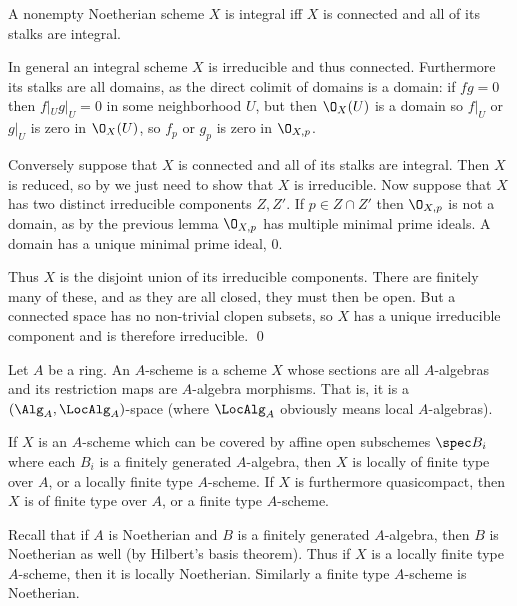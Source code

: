 \eproof

\bprop[name={noetherianintegral}]

    A nonempty Noetherian scheme $X$ is integral iff $X$ is connected and all of its stalks are integral.

\eprop

\bproof

    In general an integral scheme $X$ is irreducible and thus connected.
    Furthermore its stalks are all domains, as the direct colimit of domains is a domain: if $fg=0$ then $f|_Ug|_U=0$ in some neighborhood $U$, but then $\O_X(U)$ is a domain so
    $f|_U$ or $g|_U$ is zero in $\O_X(U)$, so $f_p$ or $g_p$ is zero in $\O_{X,p}$.

    Conversely suppose that $X$ is connected and all of its stalks are integral.
    Then $X$ is reduced, so by  we just need to show that $X$ is irreducible.
    Now suppose that $X$ has two distinct irreducible components $Z,Z'$.
    If $p\in Z\cap Z'$ then $\O_{X,p}$ is not a domain, as by the previous lemma $\O_{X,p}$ has multiple minimal prime ideals.
    A domain has a unique minimal prime ideal, $0$.

    Thus $X$ is the disjoint union of its irreducible components.
    There are finitely many of these, and as they are all closed, they must then be open.
    But a connected space has no non-trivial clopen subsets, so $X$ has a unique irreducible component and is therefore irreducible.
    \qed

\eproof

\bdefn

    Let $A$ be a ring.
    An {\emphcolor $A$-scheme} is a scheme $X$ whose sections are all $A$-algebras and its restriction maps are $A$-algebra morphisms.
    That is, it is a $(\Alg_A,\LocAlg_A)$-space (where $\LocAlg_A$ obviously means local $A$-algebras).

    If $X$ is an $A$-scheme which can be covered by affine open subschemes $\spec B_i$ where each $B_i$ is a finitely generated $A$-algebra,
    then $X$ is {\emphcolor locally of finite type} over $A$, or a {\emphcolor locally finite type $A$-scheme}.
    If $X$ is furthermore quasicompact, then $X$ is of {\emphcolor finite type} over $A$, or a {\emphcolor finite type $A$-scheme}.

\edefn

Recall that if $A$ is Noetherian and $B$ is a finitely generated $A$-algebra, then $B$ is Noetherian as well (by Hilbert's basis theorem).
Thus if $X$ is a locally finite type $A$-scheme, then it is locally Noetherian.
Similarly a finite type $A$-scheme is Noetherian.

